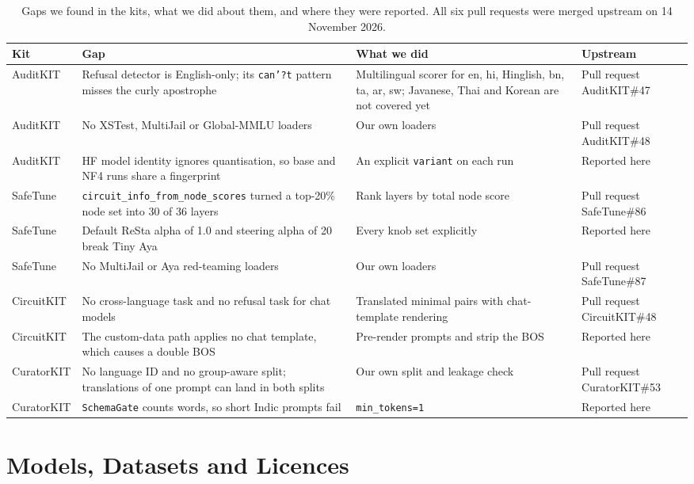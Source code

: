 \documentclass[11pt]{article}
\begin{document}
\begin{table}[t]
\centering\small
\setlength{\tabcolsep}{3pt}
\begin{tabular}{L{1.8cm}L{5.3cm}L{4.9cm}L{3.0cm}}
\toprule
Kit & Gap & What we did & Upstream \\
\midrule
AuditKIT & Refusal detector is English-only; its \texttt{can'?t} pattern misses the curly apostrophe & Multilingual
scorer for en, hi, Hinglish, bn, ta, ar, sw; Javanese, Thai and Korean are not covered yet & Pull request AuditKIT\#47 \\
AuditKIT & No XSTest, MultiJail or Global-MMLU loaders & Our own loaders & Pull request AuditKIT\#48 \\
AuditKIT & HF model identity ignores quantisation, so base and NF4 runs share a fingerprint & An explicit
\texttt{variant} on each run & Reported here \\
SafeTune & \texttt{circuit\_info\_from\_node\_scores} turned a top-20\% node set into 30 of 36 layers & Rank layers by
total node score & Pull request SafeTune\#86 \\
SafeTune & Default ReSta alpha of 1.0 and steering alpha of 20 break Tiny Aya & Every knob set explicitly & Reported
here \\
SafeTune & No MultiJail or Aya red-teaming loaders & Our own loaders & Pull request SafeTune\#87 \\
CircuitKIT & No cross-language task and no refusal task for chat models & Translated minimal pairs with chat-template
rendering & Pull request CircuitKIT\#48 \\
CircuitKIT & The custom-data path applies no chat template, which causes a double BOS & Pre-render prompts and strip
the BOS & Reported here \\
CuratorKIT & No language ID and no group-aware split; translations of one prompt can land in both splits & Our own
split and leakage check & Pull request CuratorKIT\#53 \\
CuratorKIT & \texttt{SchemaGate} counts words, so short Indic prompts fail & \texttt{min\_tokens=1} & Reported here \\
\bottomrule
\end{tabular}
\caption{Gaps we found in the kits, what we did about them, and where they were reported. All six pull requests
were merged upstream on 14 November 2026.}
\label{tab:kit-gaps}
\end{table}

\section{Models, Datasets and Licences}\label{app:licences}
\end{document}
